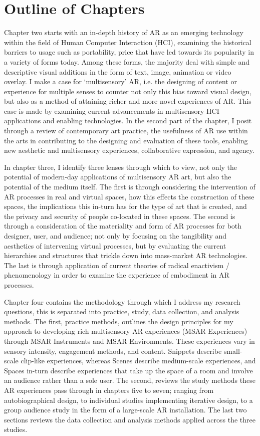 \section{Outline of Chapters}\label{sec: introduction-outline}
Chapter two starts with an in-depth history of AR as an emerging technology within the field of Human Computer Interaction (HCI), examining the historical barriers to usage such as portability, price that have led towards its popularity in a variety of forms today. Among these forms, the majority deal with simple and descriptive visual additions in the form of text, image, animation or video overlay. I make a case for `multisensory' AR, i.e. the designing of content or experience for multiple senses to counter not only this bias toward visual design, but also as a method of attaining richer and more novel experiences of AR. This case is made by examining current advancements in multisensory HCI applications and enabling technologies. In the second part of the chapter, I posit through a review of contemporary art practice, the usefulness of AR use within the arts in contributing to the designing and evaluation of these tools, enabling new aesthetic and multisensory experiences, collaborative expression, and agency.

In chapter three, I identify three lenses through which to view, not only the potential of modern-day applications of multisensory AR art, but also the potential of the medium itself. The first is through considering the intervention of AR processes in real and virtual spaces, how this effects the construction of these spaces, the implications this in-turn has for the type of art that is created, and the privacy and security of people co-located in these spaces. The second is through a consideration of the materiality and form of AR processes for both designer, user, and audience; not only by focusing on the tangibility and aesthetics of intervening virtual processes, but by evaluating the current hierarchies and structures that trickle down into mass-market AR technologies. The last is through application of current theories of radical enactivism / phenomenology in order to examine the experience of embodiment in AR processes.

Chapter four contains the methodology through which I address my research questions, this is separated into practice, study, data collection, and analysis methods. The first, practice methods, outlines the design principles for my approach to developing rich multisensory AR experiences (MSAR Experiences) through MSAR Instruments and MSAR Environments. These experiences vary in sensory intensity, engagement methods, and content. Snippets describe small-scale clip-like experiences, whereas Scenes describe medium-scale experiences, and Spaces in-turn describe experiences that take up the space of a room and involve an audience rather than a sole user. The second, reviews the study methods these AR experiences pass through in chapters five to seven; ranging from autobiographical design, to individual studies implementing iterative design, to a group audience study in the form of a large-scale AR installation. The last two sections reviews the data collection and analysis methods applied across the three studies.
 
